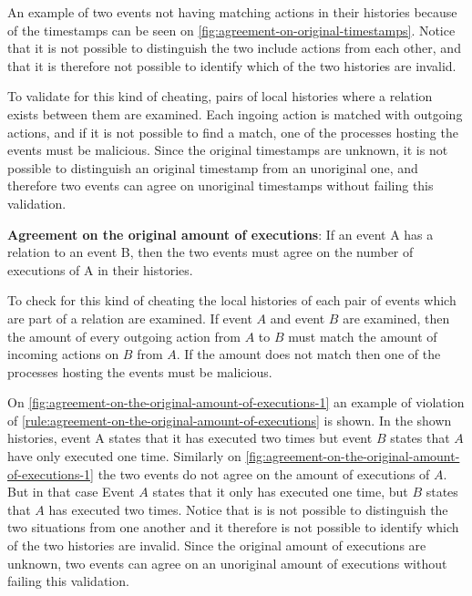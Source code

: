 	\noindent An example of two events not having matching actions in their histories because of the timestamps can be seen on \autoref{fig:agreement-on-original-timestamps}. Notice that it is not possible to distinguish the two include actions from each other, and that it is therefore not possible to identify which of the two histories are invalid.
	
	\newpar To validate for this kind of cheating, pairs of local histories where a relation exists between them are examined. Each ingoing action is matched with outgoing actions, and if it is not possible to find a match, one of the processes hosting the events must be malicious. Since the original timestamps are unknown, it is not possible to distinguish an original timestamp from an unoriginal one, and therefore two events can agree on unoriginal timestamps without failing this validation.
	
	\begin{ruledef}
		\textbf{Agreement on the original amount of executions}: If an event A has a relation to an event B, then the two events must agree on the number of executions of A in their histories.%
		\label{rule:agreement-on-the-original-amount-of-executions}
	\end{ruledef}
	
	\noindent To check for this kind of cheating the local histories of each pair of events which are part of a relation are examined. If event $A$ and event $B$ are examined, then the amount of every outgoing action from $A$ to $B$ must match the amount of incoming actions on $B$ from $A$. If the amount does not match then one of the processes hosting the events must be malicious.
	
	\newpar On \autoref{fig:agreement-on-the-original-amount-of-executions-1} an example of violation of \autoref{rule:agreement-on-the-original-amount-of-executions} is shown. In the shown histories, event A states that it has executed two times but event $B$ states that $A$ have only executed one time. Similarly on \autoref{fig:agreement-on-the-original-amount-of-executions-1} the two events do not agree on the amount of executions of $A$. But in that case Event $A$ states that it only has executed one time, but $B$ states that $A$ has executed two times. Notice that is is not possible to distinguish the two situations from one another and it therefore is not possible to identify which of the two histories are invalid. Since the original amount of executions are unknown, two events can agree on an unoriginal amount of executions without failing this validation. 
	
